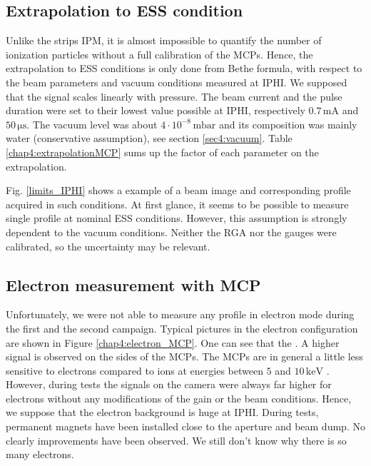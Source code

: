 \begin{refsection}
  \subsection{Extrapolation to ESS condition}
  Unlike the strips IPM, it is almost impossible to quantify the number of ionization particles without a full calibration of the MCPs. Hence, the extrapolation to ESS conditions is only done from Bethe formula, with respect to the beam parameters and vacuum conditions measured at IPHI. We supposed that the signal scales linearly with pressure. The beam current and the pulse duration were set to their lowest value possible at IPHI, respectively $0.7\,\mathrm{mA}$ and $50\, \mathrm{\mu s}$. The vacuum level was about $4 \cdot 10^{-8}\,\mathrm{mbar}$ and its composition was mainly water (conservative assumption), see section \ref{sec4:vacuum}. Table \ref{chap4:extrapolationMCP} sums up the factor of each parameter on the extrapolation.
  

  
  Fig. \ref{limits_IPHI} shows a example of a beam image and corresponding profile acquired in such conditions.
  At first glance, it seems to be possible to measure single profile at nominal ESS conditions. However, this assumption is strongly dependent to the vacuum conditions. Neither the RGA nor the gauges were calibrated, so the uncertainty may be relevant.

  \subsection{Electron measurement with MCP}
  Unfortunately, we were not able to measure any profile in electron mode during the first and the second campaign.
  Typical pictures in the electron configuration are shown in Figure \ref{chap4:electron_MCP}. One can see that the . A higher signal is observed on the sides of the MCPs.
  The MCPs are in general a little less sensitive to electrons compared to ions at energies between $5$ and $10\,\mathrm{keV}$ \cite{Wiza1979}.
  However, during tests the signals on the camera were always far higher for electrons without any modifications of the gain or the beam conditions.
  Hence, we suppose that the electron background is huge at IPHI.
  During tests, permanent magnets have been installed close to the aperture and beam dump. No clearly improvements have been observed. We still don't know why there is so many electrons.
  


\end{refsection}
